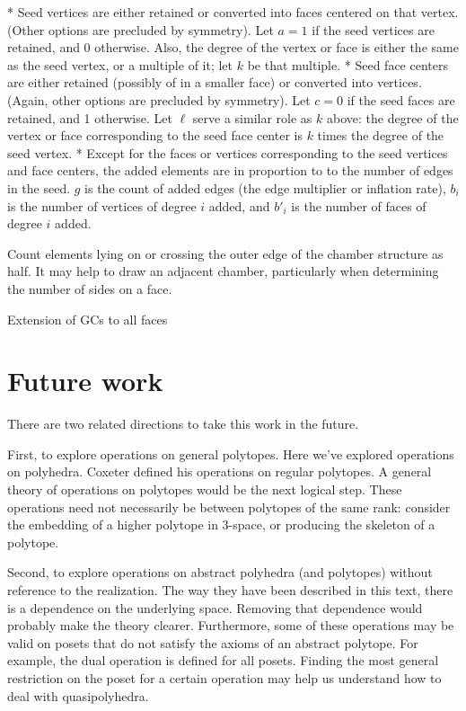 \documentclass{amsart}[12pt]
\begin{document}
* Seed vertices are either retained or converted into faces centered on that
  vertex. (Other options are precluded by symmetry). Let $a = 1$ if the
  seed vertices are retained, and 0 otherwise. Also, the degree of the vertex
  or face is either the same as the seed vertex, or a multiple of it;
  let $k$ be that multiple.
* Seed face centers are either retained (possibly of in a smaller face) or
  converted into vertices. (Again, other options are precluded by symmetry).
  Let $c = 0$ if the seed faces are retained, and 1 otherwise. Let
  $\ell$ serve a similar role as $k$ above: the degree of the vertex
  or face corresponding to the seed face center is $k$ times the degree of
  the seed vertex.
* Except for the faces or vertices corresponding to the seed vertices and face
  centers, the added elements are in proportion to to the number of edges in the
  seed. $g$ is the count of added edges (the edge multiplier or inflation
  rate), $b_i$ is the number of vertices of degree $i$ added, and
  $b'_i$ is the number of faces of degree $i$ added.

Count elements lying on or crossing the outer edge of the chamber structure as
half. It may help to draw an adjacent chamber, particularly when determining
the number of sides on a face.

Extension of GCs to all faces

\section{Future work}
There are two related directions to take this work in the future.

First, to explore operations on general polytopes. Here we've explored
operations on polyhedra. Coxeter defined his operations on regular polytopes.
A general theory of operations on polytopes would be the next logical step.
These operations need not necessarily be between polytopes of the same rank:
consider the embedding of a higher polytope in 3-space, or producing the
skeleton of a polytope.

Second, to explore operations on abstract polyhedra (and polytopes) without
reference to the realization. The way they have been described in this text,
there is a dependence on the underlying space. Removing that dependence would
probably make the theory clearer. Furthermore, some of these operations may be
valid on posets that do not satisfy the axioms of an abstract polytope. For
example, the dual operation is defined for all posets. Finding the most general
restriction on the poset for a certain operation may help us understand how to
deal with quasipolyhedra.
\end{document}
